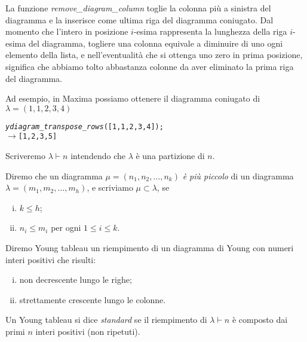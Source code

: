 La funzione \emph{remove\_diagram\_column} toglie la colonna pi\`u a
sinistra del diagramma e la inserisce come ultima riga del diagramma
coniugato. 
Dal momento che l'intero in posizione $i$-esima rappresenta
la lunghezza della riga $i$-esima del diagramma, togliere una colonna
equivale a diminuire di uno ogni elemento della lista, e
nell'eventualit\`a che si ottenga uno zero in prima posizione,
significa che abbiamo tolto abbastanza colonne da aver eliminato la
prima riga del diagramma.

Ad esempio, in Maxima possiamo ottenere il diagramma coniugato di
$\lambda=(1,1,2,3,4)$
\begin{alltt}
\emph{ydiagram\_transpose\_rows} ([1,1,2,3,4]);
\(\rightarrow\) [1,2,3,5]
\end{alltt}


\begin{notaz}
Scriveremo $\lambda \vdash n$ intendendo che $\lambda$ \`e una
partizione di $n$.
\end{notaz}

\begin{defn}
Diremo che un diagramma $\mu=(n_1,n_2,\dots,n_k)$ \emph{\`e pi\`u
piccolo} di un diagramma $\lambda=(m_1,m_2,\dots,m_h)$, e scriviamo
$\mu \subset \lambda$, se
\begin{enumerate}[(i)]
\item $k \leq h$;
\item $n_i \leq m_i$ per ogni $1 \leq i \leq k$.
\end{enumerate}
\end{defn}

\begin{defn}\label{ytab}
Diremo Young tableau un riempimento di un diagramma di Young con
numeri interi positivi che risulti:
\begin{enumerate}[(i)]
\item non decrescente lungo le righe;
\item strettamente crescente lungo le colonne.
\end{enumerate}
Un Young tableau si dice \emph{standard} se il riempimento di
$\lambda \vdash n$ \`e composto dai primi $n$ interi positivi (non
ripetuti).
\end{defn}

